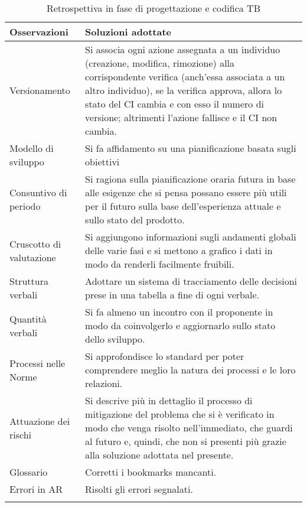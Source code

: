\documentclass[../piano_di_qualifica.tex]{subfiles}
\begin{document}
\begin{center}
	\begin{longtable}{|p{4cm}|p{11cm}|}
		\hline
		\rowcolor{lightgray}
		\textbf{Osservazioni} & \textbf{Soluzioni adottate} \\
		\hline

		Versionamento & Si associa ogni azione assegnata a un individuo (creazione, modifica, rimozione) alla corrispondente verifica (anch'essa associata a un altro individuo), se la verifica approva, allora lo stato del CI cambia e con esso il numero di versione; altrimenti l'azione fallisce e il CI non cambia. \\
		Modello di sviluppo & Si fa affidamento su una pianificazione basata sugli obiettivi \\
		Consuntivo di periodo & Si ragiona sulla pianificazione oraria futura in base alle esigenze che si pensa possano essere più utili per il futuro sulla base dell'esperienza attuale e sullo stato del prodotto. \\
		Cruscotto di valutazione & Si aggiungono informazioni sugli andamenti globali delle varie fasi e si mettono a grafico i dati in modo da renderli facilmente fruibili. \\
		Struttura verbali & Adottare un sistema di tracciamento delle decisioni prese in una tabella a fine di ogni verbale. \\
		Quantità verbali & Si fa almeno un incontro con il proponente in modo da coinvolgerlo e aggiornarlo sullo stato dello sviluppo. \\
		Processi nelle Norme & Si approfondisce lo standard \glossario{ISO/IEC 12207} per poter comprendere meglio la natura dei processi e le loro relazioni. \\
		Attuazione dei rischi & Si descrive più in dettaglio il processo di mitigazione del problema che si è verificato in modo che venga risolto nell'immediato, che guardi al futuro e, quindi, che non si presenti più grazie alla soluzione adottata nel presente. \\
		Glossario & Corretti i bookmarks mancanti. \\
		Errori in AR & Risolti gli errori segnalati. \\

		\hline
		\rowcolor{white}
		\caption{Retrospettiva in fase di progettazione e codifica TB}
	\end{longtable}
\end{center}

\end{document}
